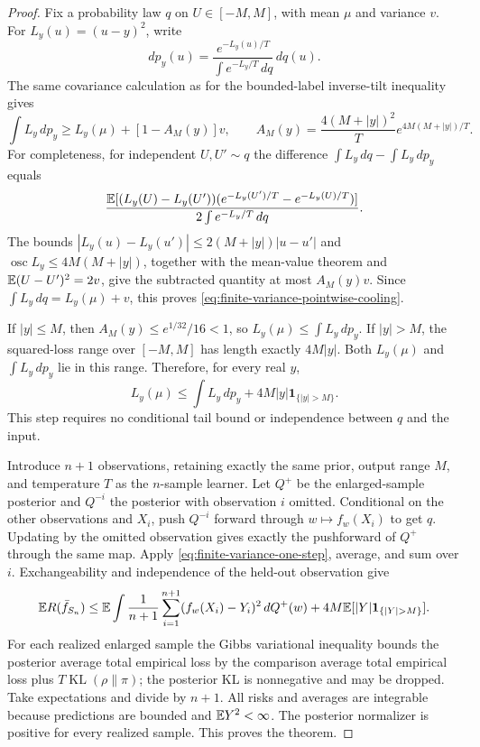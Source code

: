 \begin{proof}
Fix a probability law $q$ on $U\in[-M,M]$, with mean $\mu$ and
variance $v$. For $L_y(u)=(u-y)^2$, write
\[
 dp_y(u)=\frac{e^{-L_y(u)/T}}{\int e^{-L_y/T}\,dq}\,dq(u).
\]
The same covariance calculation as for the bounded-label inverse-tilt
inequality gives
\begin{equation}
 \int L_y\,dp_y
 \ge L_y(\mu)+[1-A_M(y)]v,
 \qquad
 A_M(y)=\frac{4(M+|y|)^2}{T}
              e^{4M(M+|y|)/T}.
 \label{eq:finite-variance-pointwise-cooling}
\end{equation}
For completeness, for independent $U,U'\sim q$ the difference
$\int L_y\,dq-\int L_y\,dp_y$ equals
\[
 \frac{\mathbb E[(L_y(U)-L_y(U'))
        (e^{-L_y(U')/T}-e^{-L_y(U)/T})]}
      {2\int e^{-L_y/T}\,dq}.
\]
The bounds
$|L_y(u)-L_y(u')|\le2(M+|y|)|u-u'|$ and
$\operatorname{osc} L_y\le4M(M+|y|)$, together with the mean-value
theorem and $\mathbb E(U-U')^2=2v$, give the subtracted quantity at most
$A_M(y)v$. Since $\int L_y\,dq=L_y(\mu)+v$, this proves
\eqref{eq:finite-variance-pointwise-cooling}.

If $|y|\le M$, then
$A_M(y)\le e^{1/32}/16<1$, so
$L_y(\mu)\le\int L_y\,dp_y$.
If $|y|>M$, the squared-loss range over $[-M,M]$ has length exactly
$4M|y|$. Both $L_y(\mu)$ and $\int L_y\,dp_y$ lie in this range.
Therefore, for every real $y$,
\begin{equation}
 L_y(\mu)\le\int L_y\,dp_y
              +4M|y|\mathbf1_{\{|y|>M\}}.
 \label{eq:finite-variance-one-step}
\end{equation}
This step requires no conditional tail bound or independence between
$q$ and the input.

Introduce $n+1$ observations, retaining exactly the same prior,
output range $M$, and temperature $T$ as the $n$-sample learner.
Let $Q^+$ be the enlarged-sample posterior and $Q^{-i}$ the posterior
with observation $i$ omitted. Conditional on the other observations
and $X_i$, push $Q^{-i}$ forward through $w\mapsto f_w(X_i)$ to get
$q$. Updating by the omitted observation gives exactly the pushforward
of $Q^+$ through the same map. Apply
\eqref{eq:finite-variance-one-step}, average, and sum over $i$.
Exchangeability and independence of the held-out observation give
\[
 \E R(\bar f_{S_n})
 \le\E\int\frac1{n+1}\sum_{i=1}^{n+1}(f_w(X_i)-Y_i)^2\,dQ^+(w)
       +4M\E[|Y|\mathbf1_{\{|Y|>M\}}].
\]
For each realized enlarged sample the Gibbs variational inequality
bounds the posterior average total empirical loss by the comparison
average total empirical loss plus
$T\operatorname{KL}(\rho\|\pi)$; the posterior KL is nonnegative
and may be dropped. Take expectations and divide by $n+1$.
All risks and averages are integrable because predictions are bounded
and $\mathbb E Y^2<\infty$. The posterior normalizer is positive for every
realized sample. This proves the theorem.
\end{proof}

